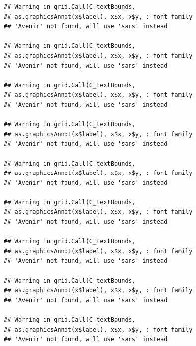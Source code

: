 \documentclass[]{krantz}
\begin{document}
\begin{verbatim}
## Warning in grid.Call(C_textBounds,
## as.graphicsAnnot(x$label), x$x, x$y, : font family
## 'Avenir' not found, will use 'sans' instead

## Warning in grid.Call(C_textBounds,
## as.graphicsAnnot(x$label), x$x, x$y, : font family
## 'Avenir' not found, will use 'sans' instead

## Warning in grid.Call(C_textBounds,
## as.graphicsAnnot(x$label), x$x, x$y, : font family
## 'Avenir' not found, will use 'sans' instead

## Warning in grid.Call(C_textBounds,
## as.graphicsAnnot(x$label), x$x, x$y, : font family
## 'Avenir' not found, will use 'sans' instead

## Warning in grid.Call(C_textBounds,
## as.graphicsAnnot(x$label), x$x, x$y, : font family
## 'Avenir' not found, will use 'sans' instead

## Warning in grid.Call(C_textBounds,
## as.graphicsAnnot(x$label), x$x, x$y, : font family
## 'Avenir' not found, will use 'sans' instead

## Warning in grid.Call(C_textBounds,
## as.graphicsAnnot(x$label), x$x, x$y, : font family
## 'Avenir' not found, will use 'sans' instead

## Warning in grid.Call(C_textBounds,
## as.graphicsAnnot(x$label), x$x, x$y, : font family
## 'Avenir' not found, will use 'sans' instead

## Warning in grid.Call(C_textBounds,
## as.graphicsAnnot(x$label), x$x, x$y, : font family
## 'Avenir' not found, will use 'sans' instead
\end{verbatim}
\end{document}

